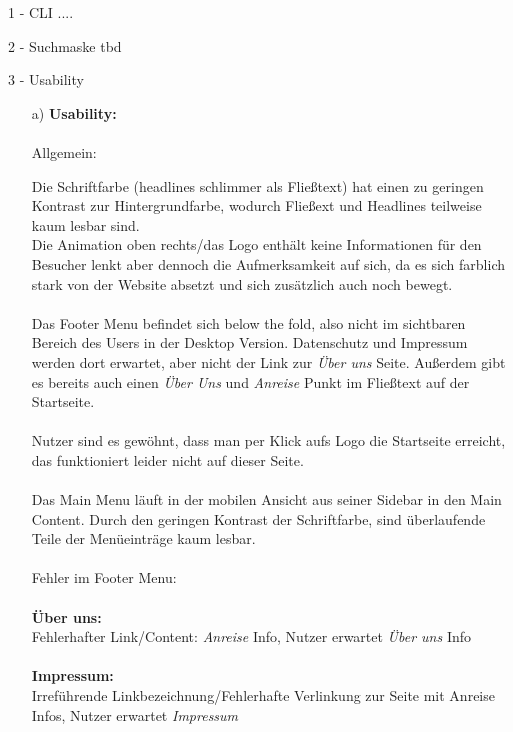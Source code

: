 \documentclass[a4paper]{article}
\begin{document}
\begin{exercise}{1 - CLI} 
....
\end{exercise}

\begin{exercise}{2 - Suchmaske} 
tbd
\end{exercise}

\begin{exercise}{3 - Usability} 
\begin{itemize}
\item[a)]\textbf{Usability:}\\\\
{\Large Allgemein:}

Die Schriftfarbe (headlines schlimmer als Fließtext) hat einen zu geringen Kontrast zur Hintergrundfarbe, wodurch Fließext und Headlines teilweise kaum lesbar sind.\\
Die Animation oben rechts/das Logo enthält keine Informationen für den Besucher lenkt aber dennoch die Aufmerksamkeit auf sich, 
da es sich farblich stark von der Website absetzt und sich zusätzlich auch noch bewegt.\\\\
Das Footer Menu befindet sich below the fold, also nicht im sichtbaren Bereich des Users in der Desktop Version. Datenschutz und Impressum werden dort erwartet, aber nicht der Link zur \textit{Über uns} Seite.
Außerdem gibt es bereits auch einen \textit{Über Uns} und \textit{Anreise} Punkt im Fließtext auf der Startseite. \\\\
Nutzer sind es gewöhnt, dass man per Klick aufs Logo die Startseite erreicht, das funktioniert leider nicht auf dieser Seite.\\\\
Das Main Menu läuft in der mobilen Ansicht aus seiner Sidebar in den Main Content. Durch den geringen Kontrast der Schriftfarbe, sind überlaufende Teile der Menüeinträge kaum lesbar.\\\\
{\Large Fehler im Footer Menu:}\\\\
\textbf{Über uns:}\\
Fehlerhafter Link/Content: \textit{Anreise} Info, Nutzer erwartet \textit{Über uns} Info\\\\
\textbf{Impressum:}\\
Irreführende Linkbezeichnung/Fehlerhafte Verlinkung zur Seite mit Anreise Infos, Nutzer erwartet \textit{Impressum}\\\\

\end{itemize}
\end{exercise}
\end{document}
